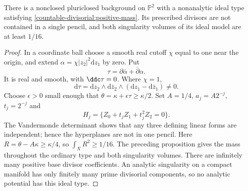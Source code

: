 \begin{example}\label{countable-divisorial:nonclosed-example}
There is a nonclosed pluriclosed background on $\mathbb P^2$
with a nonanalytic ideal type satisfying
\cref{countable-divisorial:positive-mass}. Its prescribed
divisors are not contained in a single pencil, and both
singularity volumes of its ideal model are at least $1/16$.
\end{example}
\begin{proof}
In a coordinate ball choose a smooth real cutoff $\chi$ equal
to one near the origin, and extend
$\alpha=\chi|z_2|^2\mathrm dz_1$ by zero. Put
\[
 \tau=\partial\overline\alpha+\bar\partial\alpha.
\]
It is real and smooth, with $\ddc\tau=0$. Where $\chi=1$,
\[
 \mathrm d\tau=\mathrm dz_2\wedge\mathrm d\bar z_2
                  \wedge(\mathrm dz_1-\mathrm d\bar z_1)\ne0.
\]
Choose $\epsilon>0$ small enough that
$\theta=\kappa+\epsilon\tau\geq\kappa/2$.
Set $A=1/4$, $a_j=A2^{-j}$, $t_j=2^{-j}$ and
\[
 H_j=\{Z_0+t_jZ_1+t_j^2Z_2=0\}.
\]
The Vandermonde determinant shows that any three defining
linear forms are independent; hence the hyperplanes are not
in one pencil. Here $R=\theta-A\kappa\geq\kappa/4$, so
$\int_XR^2\geq1/16$. The preceding proposition gives the
mass throughout the ordinary type and both singularity volumes.
There are infinitely many positive base divisor coefficients.
An analytic singularity on a compact manifold has only
finitely many prime divisorial components, so no analytic
potential has this ideal type.
\end{proof}
